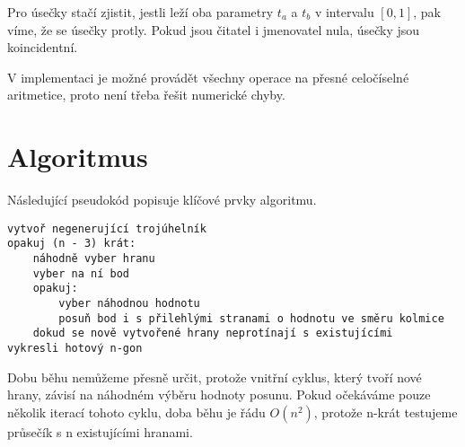 \documentclass[11pt]{article}
\begin{document}
Pro úsečky stačí zjistit, jestli leží oba parametry $t_a$ a $t_b$ v intervalu
$[0, 1]$, pak víme, že se úsečky protly. Pokud jsou čitatel i jmenovatel nula,
úsečky jsou koincidentní.

V implementaci je možné provádět všechny operace na přesné celočíselné
aritmetice, proto není třeba řešit numerické chyby.

\section{Algoritmus}
Následující pseudokód popisuje klíčové prvky algoritmu.

\begin{verbatim}
vytvoř negenerující trojúhelník
opakuj (n - 3) krát:
    náhodně vyber hranu
    vyber na ní bod
    opakuj:
        vyber náhodnou hodnotu
        posuň bod i s přilehlými stranami o hodnotu ve směru kolmice
    dokud se nově vytvořené hrany neprotínají s existujícími
vykresli hotový n-gon
\end{verbatim}

Dobu běhu nemůžeme přesně určit, protože vnitřní cyklus, který tvoří nové
hrany, závisí na náhodném výběru hodnoty posunu. Pokud očekáváme pouze několik
iterací tohoto cyklu, doba běhu je řádu $O(n^2)$, protože n-krát testujeme
průsečík s n existujícími hranami.
\end{document}
